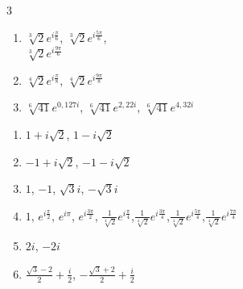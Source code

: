 \documentclass[a4paper,norsk,12pt]{article}
\begin{document}
\begin{appendix}
\begin{multicols}{3}
\begin{enumerate}[label=10\alph*)]
\item $\sqrt[3]{2}e^{i\frac{\pi}{6}}$, $\sqrt[3]{2}e^{i\frac{5\pi}{6}}$, \\$\sqrt[3]{2}e^{i\frac{9\pi}{6}}$
\item $\sqrt[4]{2}e^{i\frac{\pi}{8}}$, $\sqrt[4]{2}e^{i\frac{9\pi}{8}}$
\item $\sqrt[6]{41}e^{0,127i}$, $\sqrt[6]{41}e^{2,22i}$, $\sqrt[6]{41}e^{4,32i}$
\end{enumerate}
\vspace{6pt}
\begin{enumerate}[label=11\alph*)]
\item $1+i\sqrt{2}$, $1-i\sqrt{2}$
\item $-1+i\sqrt{2}$, $-1-i\sqrt{2}$
\item $1$, $-1$, $\sqrt{3}i$, $-\sqrt{3}i$
\item $1$, $e^{i\frac{\pi}{2}}$, $e^{i\pi}$, $e^{i\frac{3\pi}{2}}$,
	$\frac{1}{\sqrt[4]{2}}e^{i\frac{\pi}{4}}$,$\frac{1}{\sqrt[4]{2}}e^{i\frac{3\pi}{4}}$,$\frac{1}{\sqrt[4]{2}}e^{i\frac{5\pi}{4}}$,$\frac{1}{\sqrt[4]{2}}e^{i\frac{7\pi}{4}}$
\item $2i$, $-2i$
\item $\frac{\sqrt{3}-2}{2}+\frac{i}{2}$, $-\frac{\sqrt{3}+2}{2}+\frac{i}{2}$
\end{enumerate}
\end{multicols}
\end{appendix}
\end{document}

